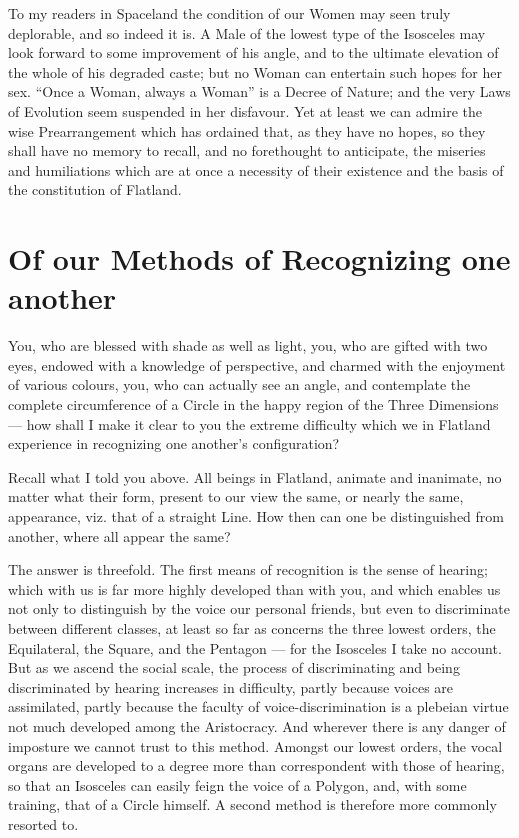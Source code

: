\documentclass[12pt, a4paper, oneside]{memoir}
\begin{document}
To my readers in Spaceland the condition of our Women may seen truly
deplorable, and so indeed it is. A Male of the lowest type of the Isosceles
may look forward to some improvement of his angle, and to the ultimate
elevation of the whole of his degraded caste; but no Woman can entertain such
hopes for her sex. ``Once a Woman, always a Woman'' is a Decree of Nature; and
the very Laws of Evolution seem suspended in her disfavour. Yet at least we
can admire the wise Prearrangement which has ordained that, as they have no
hopes, so they shall have no memory to recall, and no forethought to
anticipate, the miseries and humiliations which are at once a necessity of
their existence and the basis of the constitution of Flatland.








\chapter{Of our Methods of Recognizing one another} You, who are blessed with
shade as well as light, you, who are gifted with two eyes, endowed with a
knowledge of perspective, and charmed with the enjoyment of various colours,
you, who can actually see an angle, and contemplate the complete circumference
of a Circle in the happy region of the Three Dimensions --- how shall I make it
clear to you the extreme difficulty which we in Flatland experience in
recognizing one another's configuration?

Recall what I told you above. All beings in Flatland, animate and inanimate,
no matter what their form, present to our view the same, or nearly the same,
appearance, viz. that of a straight Line. How then can one be distinguished
from another, where all appear the same?

The answer is threefold. The first means of recognition is the sense of
hearing; which with us is far more highly developed than with you, and which
enables us not only to distinguish by the voice our personal friends, but even
to discriminate between different classes, at least so far as concerns the
three lowest orders, the Equilateral, the Square, and the Pentagon --- for the
Isosceles I take no account. But as we ascend the social scale, the process of
discriminating and being discriminated by hearing increases in difficulty,
partly because voices are assimilated, partly because the faculty of
voice-discrimination is a plebeian virtue not much developed among the
Aristocracy. And wherever there is any danger of imposture we cannot trust to
this method. Amongst our lowest orders, the vocal organs are developed to a
degree more than correspondent with those of hearing, so that an Isosceles can
easily feign the voice of a Polygon, and, with some training, that of a Circle
himself. A second method is therefore more commonly resorted to.
\end{document}
